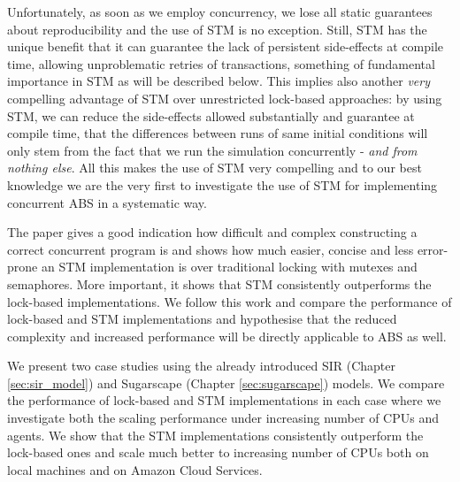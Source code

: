 Unfortunately, as soon as we employ concurrency, we lose all static guarantees about reproducibility and the use of STM is no exception. Still, STM has the unique benefit that it can guarantee the lack of persistent side-effects at compile time, allowing unproblematic retries of transactions, something of fundamental importance in STM as will be described below. This implies also another \textit{very} compelling advantage of STM over unrestricted lock-based approaches: by using STM, we can reduce the side-effects allowed substantially and guarantee at compile time, that the differences between runs of same initial conditions will only stem from the fact that we run the simulation concurrently - \textit{and from nothing else}. All this makes the use of STM very compelling and to our best knowledge we are the very first to investigate the use of STM for implementing concurrent ABS in a systematic way.

\medskip

The paper \cite{discolo_lock_2006} gives a good indication how difficult and complex constructing a correct concurrent program is and shows how much easier, concise and less error-prone an STM implementation is over traditional locking with mutexes and semaphores. More important, it shows that STM consistently outperforms the lock-based implementations. We follow this work and compare the performance of lock-based and STM implementations and hypothesise that the reduced complexity and increased performance will be directly applicable to ABS as well.

We present two case studies using the already introduced SIR (Chapter \ref{sec:sir_model}) and Sugarscape (Chapter \ref{sec:sugarscape}) models. We compare the performance of lock-based and STM implementations in each case where we investigate both the scaling performance under increasing number of CPUs and agents. We show that the STM implementations consistently outperform the lock-based ones and scale much better to increasing number of CPUs both on local machines and on Amazon Cloud Services.










